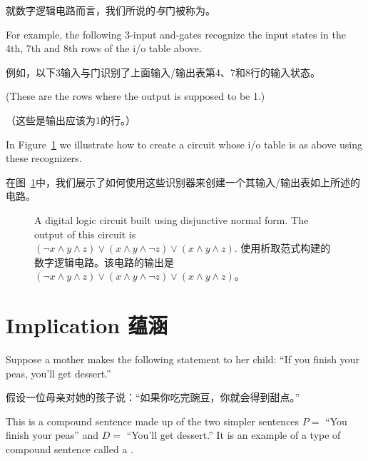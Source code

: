就数字逻辑电路而言，我们所说的{\em 与}门被称为。

For example,
the following 3-input and-gates recognize the input states in
the 4th, 7th and 8th rows of the i/o table above.

例如，以下3输入与门识别了上面输入/输出表第4、7和8行的输入状态。

(These are the rows 
where the output is supposed to be 1.)

（这些是输出应该为1的行。）

\begin{center}

\end{center}

In Figure~\ref{fig:dnf} we illustrate how to create a circuit whose
i/o table is as above using these recognizers.

在图~\ref{fig:dnf}中，我们展示了如何使用这些识别器来创建一个其输入/输出表如上所述的电路。

\begin{figure}[!hbtp] 
\begin{center}

\end{center}
\caption[Disjunctive normal form.析取范式]{A digital logic circuit built %
using disjunctive normal form.
The output of this circuit is %
$({\lnot}x \land y \land z) \lor (x \land y \land {\lnot}z) \lor (x \land y \land z)$. 使用析取范式构建的数字逻辑电路。该电路的输出是 $({\lnot}x \land y \land z) \lor (x \land y \land {\lnot}z) \lor (x \land y \land z)$。}
\label{fig:dnf}
\end{figure}

\newpage




\newpage

\section{Implication 蕴涵}
\label{sec:impl}

Suppose a mother makes the following statement to her child:
``If you finish your peas, you'll get dessert.''

假设一位母亲对她的孩子说：“如果你吃完豌豆，你就会得到甜点。”

This is a compound sentence made up of the two simpler
sentences $P=$ ``You finish your peas'' and $D=$ ``You'll get dessert.''
It is an example of a type of compound sentence called a 
.

